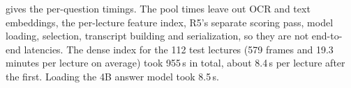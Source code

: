  gives the per-question timings.
The pool times leave out OCR and text embeddings, the per-lecture feature index, R5's separate scoring pass, model loading, selection, transcript building and serialization, so they are not end-to-end latencies.
The dense index for the 112 test lectures (579 frames and 19.3 minutes per lecture on average) took 955\,s in total, about 8.4\,s per lecture after the first.
Loading the 4B answer model took 8.5\,s.
